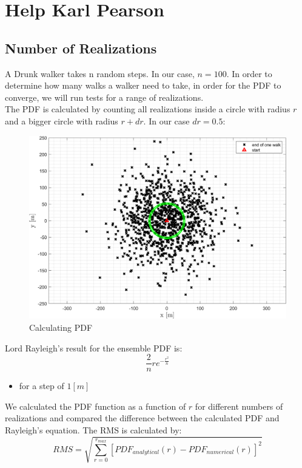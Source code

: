 \documentclass[11pt, a4paper]{article}
\begin{document}
\newpage
\section{Help Karl Pearson}
\subsection{Number of Realizations}
A Drunk walker takes n random steps. In our case, $n=100$. In order to determine how many walks a walker need to take, in order for the PDF to converge, we will run tests for a range of realizations. \\
The PDF is calculated by counting all realizations inside a circle with radius $r$ and a bigger circle with radius $r+dr$. In our case $dr=0.5$:
\begin{figure}[H]
    \centering
    \includegraphics[width=\textwidth]{images/graph1.png}
    \caption{Calculating PDF}
    \label{fig: calculating pdf}
\end{figure}
\noindent Lord Rayleigh's result for the ensemble PDF is:
\begin{equation}
    \displaystyle\frac{2}{n}re^{-\frac{r^2}{n}}
\end{equation}
\begin{itemize}
    \item for a step of $1[m]$
\end{itemize}
\noindent We calculated the PDF function as a function of $r$ for different numbers of realizations and compared the difference between the calculated PDF and Rayleigh's equation. The RMS is calculated by:
\begin{equation}
    RMS=\sqrt{\displaystyle\sum_{r=0}^{r_{max}}\left[PDF_{analytical}\left(r\right)-PDF_{numerical}\left(r\right)\right]^2}
\end{equation}
\end{document}
